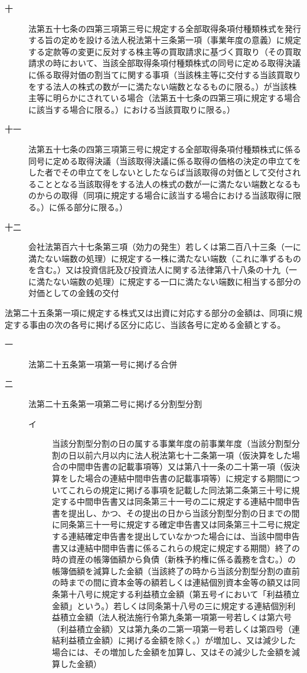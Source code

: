 \documentclass[twocolumn,a4j,10pt]{ltjtarticle}
\begin{document}
\begin{description}
\begin{description}
\item[十]法第五十七条の四第三項第三号に規定する全部取得条項付種類株式を発行する旨の定めを設ける法人税法第十三条第一項（事業年度の意義）に規定する定款等の変更に反対する株主等の買取請求に基づく買取り（その買取請求の時において、当該全部取得条項付種類株式の同号に定める取得決議に係る取得対価の割当てに関する事項（当該株主等に交付する当該買取りをする法人の株式の数が一に満たない端数となるものに限る。）が当該株主等に明らかにされている場合（法第五十七条の四第三項に規定する場合に該当する場合に限る。）における当該買取りに限る。）
\item[十一]法第五十七条の四第三項第三号に規定する全部取得条項付種類株式に係る同号に定める取得決議（当該取得決議に係る取得の価格の決定の申立てをした者でその申立てをしないとしたならば当該取得の対価として交付されることとなる当該取得をする法人の株式の数が一に満たない端数となるものからの取得（同項に規定する場合に該当する場合における当該取得に限る。）に係る部分に限る。）
\item[十二]会社法第百六十七条第三項（効力の発生）若しくは第二百八十三条（一に満たない端数の処理）に規定する一株に満たない端数（これに準ずるものを含む。）又は投資信託及び投資法人に関する法律第八十八条の十九（一に満たない端数の処理）に規定する一口に満たない端数に相当する部分の対価としての金銭の交付
\end{description}
\item[\rensuji{2}]法第二十五条第一項に規定する株式又は出資に対応する部分の金額は、同項に規定する事由の次の各号に掲げる区分に応じ、当該各号に定める金額とする。
\begin{description}
\item[一]法第二十五条第一項第一号に掲げる合併
\item[二]法第二十五条第一項第二号に掲げる分割型分割
\begin{description}
\item[イ]当該分割型分割の日の属する事業年度の前事業年度（当該分割型分割の日以前六月以内に法人税法第七十二条第一項（仮決算をした場合の中間申告書の記載事項等）又は第八十一条の二十第一項（仮決算をした場合の連結中間申告書の記載事項等）に規定する期間についてこれらの規定に掲げる事項を記載した同法第二条第三十号に規定する中間申告書又は同条第三十一号の二に規定する連結中間申告書を提出し、かつ、その提出の日から当該分割型分割の日までの間に同条第三十一号に規定する確定申告書又は同条第三十二号に規定する連結確定申告書を提出していなかつた場合には、当該中間申告書又は連結中間申告書に係るこれらの規定に規定する期間）終了の時の資産の帳簿価額から負債（新株予約権に係る義務を含む。）の帳簿価額を減算した金額（当該終了の時から当該分割型分割の直前の時までの間に資本金等の額若しくは連結個別資本金等の額又は同条第十八号に規定する利益積立金額（第五号イにおいて「利益積立金額」という。）若しくは同条第十八号の三に規定する連結個別利益積立金額（法人税法施行令第九条第一項第一号若しくは第六号（利益積立金額）又は第九条の二第一項第一号若しくは第四号（連結利益積立金額）に掲げる金額を除く。）が増加し、又は減少した場合には、その増加した金額を加算し、又はその減少した金額を減算した金額）

\end{description}
\end{description}
\end{description}
\end{document}
